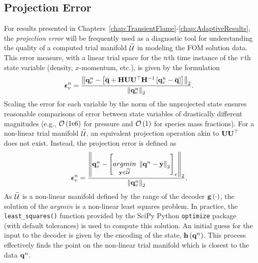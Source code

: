 \subsection{Projection Error}\label{subsec:projError}

For results presented in Chapters~\ref{chap:TransientFlame}-\ref{chap:AdaptiveResults}, the \textit{projection error} will be frequently used as a diagnostic tool for understanding the quality of a computed trial manifold $\trialSpace$ in modeling the FOM solution data. This error measure, with a linear trial space for the $n$th time instance of the $v$th state variable (density, $x$-momentum, etc.), is given by the formulation
%
\begin{equation}\label{eq:projErrLinear}
    \errVecVar^\timeIdx = \frac{\left\Vert \stateVecVar^\timeIdx - \left[\stateVecCent + \scaleMat \basisMat \basisMat^\top \scaleMatInv \left[ \stateVecVar^\timeIdx - \stateVecCent \right] \right] \right\Vert_2}{\left\Vert \stateVecVar^\timeIdx \right\Vert_2}.
\end{equation}
%
Scaling the error for each variable by the norm of the unprojected state ensures reasonable comparisons of error between state variables of drastically different magnitudes (e.g., $\mathcal{O}\left(1\text{e}6\right)$ for pressure and $\mathcal{O}\left(1\right)$ for species mass fractions). For a non-linear trial manifold $\trialSpace$, an equivalent projection operation akin to $\basisMat \basisMat^\top$ does not exist. Instead, the projection error is defined as
%
\begin{equation}\label{eq:projErrNonlin}
    \errVecVar^\timeIdx = \frac{\left\Vert \stateVecVar^\timeIdx - \left[ \argmin{\dummyVec \in \trialSpace} \left\Vert \stateVec^\timeIdx - \dummyVec \right\Vert_2 \right]_{\varIdx} \right\Vert_2}{\left\Vert \stateVecVar^\timeIdx \right\Vert_2}.
\end{equation}
%
As $\trialSpace$ is a non-linear manifold defined by the range of the decoder $\mathbf{g} \left(\cdot\right)$, the solution of the $argmin$ is a non-linear least squares problem. In practice, the \verb|least_squares()| function provided by the SciPy Python \texttt{optimize} package (with default tolerances) is used to compute this solution. An initial guess for the input to the decoder is given by the encoding of the state, $\mathbf{h} \left(\mathbf{q}^{n}\right)$. This process effectively finds the point on the non-linear trial manifold which is closest to the data $\mathbf{q}^{n}$.

